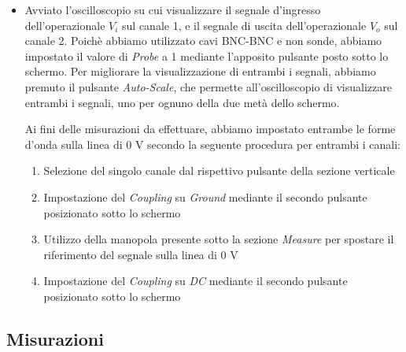 \begin{itemize}
    \item Avviato l'oscilloscopio su cui visualizzare il segnale d'ingresso dell'operazionale $V_i$ sul canale 1, e il segnale di uscita dell'operazionale $V_o$ sul canale 2.
    Poichè abbiamo utilizzato cavi BNC-BNC e non sonde, abbiamo impostato il valore di \emph{Probe} a 1 mediante l'apposito pulsante posto sotto lo schermo.
    Per migliorare la visualizzazione di entrambi i segnali, abbiamo premuto il pulsante \emph{Auto-Scale}, che permette all'oscilloscopio di visualizzare entrambi i segnali, uno per ognuno della due metà dello schermo.
    
    Ai fini delle misurazioni da effettuare, abbiamo impostato entrambe le forme d'onda sulla linea di 0 V secondo la seguente procedura per entrambi i canali:
    \begin{enumerate}
        \item Selezione del singolo canale dal rispettivo pulsante della sezione verticale
        \item Impostazione del \emph{Coupling} su \textit{Ground} mediante il secondo pulsante posizionato sotto lo schermo
        \item Utilizzo della manopola presente sotto la sezione \textit{Measure} per spostare il riferimento del segnale sulla linea di 0 V
        \item Impostazione del \emph{Coupling} su \textit{DC} mediante il secondo pulsante posizionato sotto lo schermo  
\end{enumerate}
\end{itemize}


\subsection{Misurazioni}
